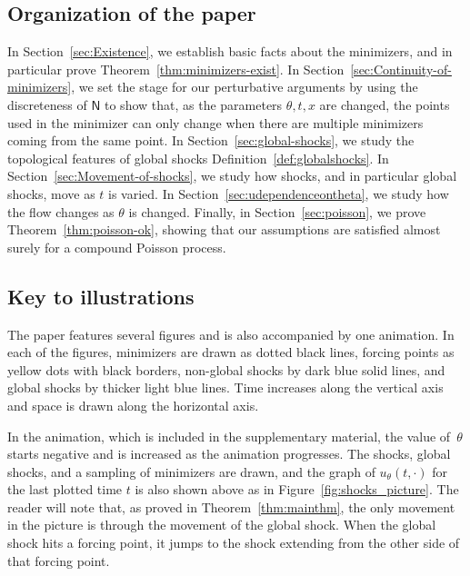 \documentclass[AHL,Unicode,longabstracts]{cedram}
\newcommand*\ssN{\mathsf{N}}
\begin{document}
\subsection*{Organization of the paper}

In Section~\ref{sec:Existence}, we establish basic facts about the minimizers, and in particular prove Theorem~\ref{thm:minimizers-exist}. In Section~\ref{sec:Continuity-of-minimizers}, we set the stage for our perturbative arguments by using the discreteness of $\ssN$ to show that, as the parameters $\theta,t,x$ are changed, the points used in the minimizer can only change when there are multiple minimizers coming from the same point. In Section~\ref{sec:global-shocks}, we study the topological features of global shocks Definition~\ref{def:globalshocks}. In Section~\ref{sec:Movement-of-shocks}, we study how shocks, and in particular global shocks, move as $t$ is varied. In Section~\ref{sec:udependenceontheta}, we study how the flow changes as $\theta$ is changed. Finally, in
Section~\ref{sec:poisson}, we prove Theorem~\ref{thm:poisson-ok}, showing that our assumptions are satisfied almost surely for a compound Poisson process.

\subsection*{Key to illustrations}
\label{subsec:illustrations}



The paper features several figures and is also accompanied by one animation. In each of the figures, minimizers are drawn as dotted black lines, forcing points as yellow dots with black borders, non-global shocks by dark blue solid lines, and global shocks by thicker light blue lines. Time increases along the vertical axis and space is drawn along the horizontal axis.

In the animation, which is included in the supplementary material, the value of~$\theta$ starts negative and is increased as the animation progresses. The shocks, global shocks, and a sampling of minimizers are drawn, and the graph of $u_{\theta}(t,\cdot)$ for the last plotted time $t$ is also shown above as in Figure~\ref{fig:shocks_picture}. The reader will note that, as proved in Theorem~\ref{thm:mainthm}, the only movement in the picture is through the movement of the global shock. When the global shock hits a forcing point, it jumps to the shock extending from the other side of that forcing point.
\end{document}
